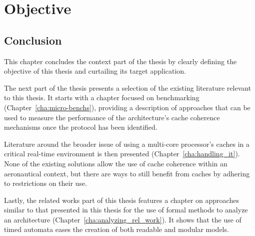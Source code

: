 \chapter{Objective}
\label{cha:second_intro}




\stopallthesefloats
\section{Conclusion}
This chapter concludes the context part of the thesis by clearly defining the
objective of this thesis and curtailing its target application.

The next part of the thesis presents a selection of the existing literature
relevant to this thesis. It starts with a chapter focused on benchmarking
(Chapter~\ref{cha:micro-benchs}), providing a description of approaches that can
be used to measure the performance of the architecture's cache coherence
mechanisms once the protocol has been identified.

Literature around the broader issue of using a multi-core processor's caches in
a critical real-time environment is then presented
(Chapter~\ref{cha:handling_it}). None of the existing solutions allow the use of
cache coherence within an aeronautical context, but there are ways to still
benefit from caches by adhering to restrictions on their use.

Lastly, the related works part of this thesis features a chapter on approaches
similar to that presented in this thesis for the use of formal methods to
analyze an architecture (Chapter~\ref{cha:analyzing_rel_work}). It shows that
the use of timed automata eases the creation of both readable and modular
models.
